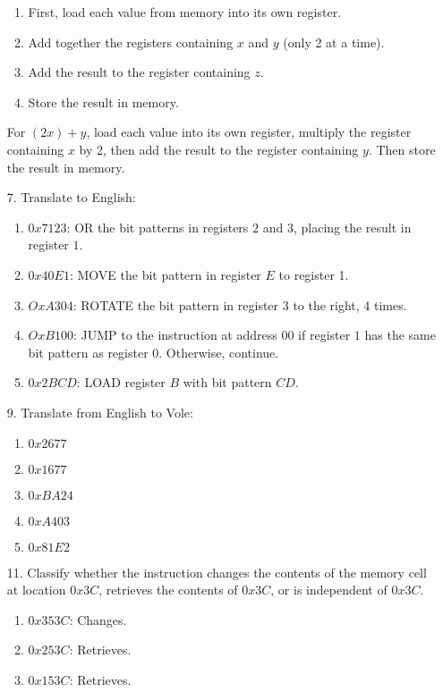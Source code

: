 \documentclass[hidelinks,12pt]{article}
\begin{document}
\begin{enumerate}
\begin{enumerate}
        \item First, load each value from memory into its own register.
        \item Add together the registers containing $x$ and $y$ (only 2 at a time).
        \item Add the result to the register containing $z$.
        \item Store the result in memory.
    \end{enumerate}
    For $(2x)+y$, load each value into its own register, multiply the register containing $x$ by 2, then add the result to the register containing $y$. Then store the result in memory.
    \item[7.]Translate to English:
        \begin{enumerate}
            \item $0x7123$: OR the bit patterns in registers $2$ and 3, placing the result in register $1$.
            \item $0x40E1$: MOVE the bit pattern in register $E$ to register 1.
            \item $OxA304$: ROTATE the bit pattern in register 3 to the right, 4 times.
            \item $OxB100$: JUMP to the instruction at address $00$ if register $1$ has the same bit pattern as register 0. Otherwise, continue.
            \item $0x2BCD$: LOAD register $B$ with bit pattern $CD$.
        \end{enumerate}
    \item[9.] Translate from English to Vole:
        \begin{enumerate}
            \item $0x2677$
            \item $0x1677$
            \item $0xBA24$
            \item $0xA403$
            \item $0x81E2$
        \end{enumerate}
    \item[11.]Classify whether the instruction changes the contents of the memory cell at location $0x3C$, retrieves the contents of $0x3C$, or is independent of $0x3C$.
        \begin{enumerate}
            \item $0x353C$: Changes.
            \item $0x253C$: Retrieves.
            \item $0x153C$: Retrieves.

\end{enumerate}
\end{enumerate}
\end{document}
